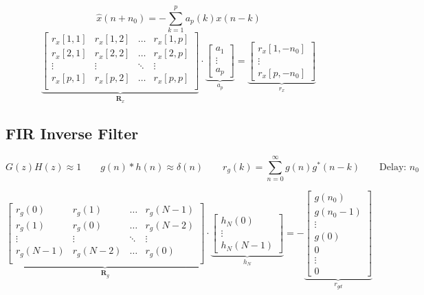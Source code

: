 		$$\hat{x}(n+n_0) = - \sum\limits_{k=1}^p a_p(k) x(n-k)$$
		$$
		\underbrace{\begin{bmatrix}
    		r_x[1,1] & r_x[1,2] & \hdots & r_x[1,p] \\                                   
    		r_x[2,1] & r_x[2,2] & \hdots & r_x[2,p] \\
    		\vdots & \vdots & \ddots & \vdots \\                             
    		r_x[p,1] & r_x[p,2] & \hdots & r_x[p,p] \\                        
		\end{bmatrix}  }_{\bm R_x} \cdot 
		\underbrace{\begin{bmatrix}
    		a_1 \\
    		\vdots \\
    		a_p
		\end{bmatrix}  }_{a_p}= \underbrace{\begin{bmatrix}
    		r_x[1,-n_0] \\
    		\vdots \\
    		r_x[p,-n_0]
		\end{bmatrix}  }_{r_x}$$

\subsection{FIR Inverse Filter }
$$G(z)H(z) \approx 1\qquad g(n)*h(n) \approx \delta(n) \qquad r_g(k) = \sum\limits_{n=0}^\infty g(n)g^*(n-k) \qquad \text{Delay: } n_0$$

		$$
		\underbrace{\begin{bmatrix}
    		r_g(0) & r_g(1) & \hdots & r_g(N-1) \\                                   
    		r_g(1) & r_g(0) & \hdots & r_g(N-2) \\
    		\vdots & \vdots & \ddots & \vdots \\                             
    		r_g(N-1) & r_g(N-2) & \hdots & r_g(0) \\                        
		\end{bmatrix}  }_{\bm R_g} \cdot 
		\underbrace{\begin{bmatrix}
    		h_N(0) \\
    		\vdots \\
    		h_N(N-1)
		\end{bmatrix}  }_{h_N}= -\underbrace{\begin{bmatrix}
    		g(n_0) \\
    		g(n_0 - 1)	 \\
    		\vdots \\
    		g(0)\\
    		0\\
    		\vdots \\
    		0
		\end{bmatrix}  }_{r_{gd}}$$


